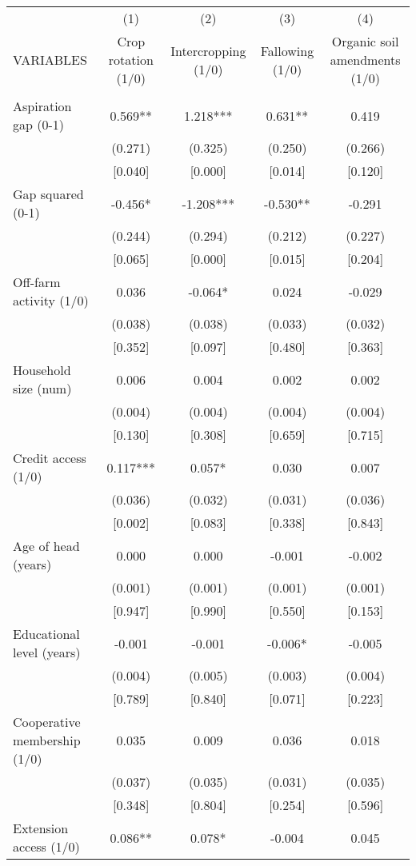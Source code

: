 \documentclass[]{article}
\begin{document}
\begin{tabular}{lcccc} \hline
 & (1) & (2) & (3) & (4) \\
VARIABLES & Crop rotation (1/0) & Intercropping (1/0) & Fallowing (1/0) & Organic soil amendments (1/0) \\ \hline
 &  &  &  &  \\
Aspiration gap (0-1) & 0.569** & 1.218*** & 0.631** & 0.419 \\
 & (0.271) & (0.325) & (0.250) & (0.266) \\
 & [0.040] & [0.000] & [0.014] & [0.120] \\
Gap squared (0-1) & -0.456* & -1.208*** & -0.530** & -0.291 \\
 & (0.244) & (0.294) & (0.212) & (0.227) \\
 & [0.065] & [0.000] & [0.015] & [0.204] \\
Off-farm activity (1/0) & 0.036 & -0.064* & 0.024 & -0.029 \\
 & (0.038) & (0.038) & (0.033) & (0.032) \\
 & [0.352] & [0.097] & [0.480] & [0.363] \\
Household size (num) & 0.006 & 0.004 & 0.002 & 0.002 \\
 & (0.004) & (0.004) & (0.004) & (0.004) \\
 & [0.130] & [0.308] & [0.659] & [0.715] \\
Credit access (1/0) & 0.117*** & 0.057* & 0.030 & 0.007 \\
 & (0.036) & (0.032) & (0.031) & (0.036) \\
 & [0.002] & [0.083] & [0.338] & [0.843] \\
Age of head (years) & 0.000 & 0.000 & -0.001 & -0.002 \\
 & (0.001) & (0.001) & (0.001) & (0.001) \\
 & [0.947] & [0.990] & [0.550] & [0.153] \\
Educational level (years) & -0.001 & -0.001 & -0.006* & -0.005 \\
 & (0.004) & (0.005) & (0.003) & (0.004) \\
 & [0.789] & [0.840] & [0.071] & [0.223] \\
Cooperative membership (1/0) & 0.035 & 0.009 & 0.036 & 0.018 \\
 & (0.037) & (0.035) & (0.031) & (0.035) \\
 & [0.348] & [0.804] & [0.254] & [0.596] \\
Extension access (1/0) & 0.086** & 0.078* & -0.004 & 0.045 \\

\end{tabular}
\end{document}
